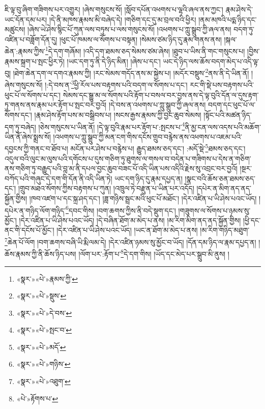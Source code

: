 ཇི་ལྟ་བུ་ཞིག་གཟིགས་པར་འགྱུར། །ཞེས་གསུངས་སོ། །སློབ་དཔོན་འཕགས་པ་ལྷའི་ཞལ་ནས་ཀྱང་། རྣམ་ཤེས་དེ་ཡང་དོན་དམ་པར། །དེ་ནི་མཁས་རྣམས་མི་བཞེད་དེ། །གཅིག་དང་དུ་མ་བྲལ་བའི་ཕྱིར། །ནམ་མཁའི་པདྨ་ཉིད་དང་མཚུངས། །ཞེས་ཡེ་ཤེས་སྙིང་པོ་ཀུན་ལས་བཏུས་པ་ལས་གསུངས་སོ། །འཕགས་པ་ཀླུ་སྒྲུབ་ཀྱི་ཞལ་ནས། བདག་ཏུ་འཛིན་པ་བཟློག་དོན་དུ། །ཕུང་པོ་ཁམས་ལ་སོགས་པ་བསྟན། །སེམས་ཙམ་ཉིད་དུ་རྣམ་གནས་ནས། །སྐལ་ཆེན་:རྣམས་ཀྱིས་\footnote{«སྣར་»«པེ་»རྣམས་ཀྱི་}དེ་དག་གཞོམ། །འདི་དག་ཐམས་ཅད་སེམས་ཙམ་ཞེས། །ཐུབ་པ་ཡིས་ནི་གང་གསུངས་པ། །བྱིས་རྣམས་སྐྲག་པ་སྤང་ཕྱིར་ཏེ། །ཡང་དག་ཏུ་ནི་དེ་ཉིད་མིན། །ཞེས་པ་དང་། ཡང་དེ་ཉིད་ལས་ཆོས་བདག་མེད་པ་འདི་ལྟ་བུ། །ཐེག་ཆེན་དག་ལ་དགའ་རྣམས་ཀྱི། །རང་སེམས་གདོད་ནས་མ་སྐྱེས་པ། །མདོར་བསྡུས་\footnote{«སྣར་»«པེ་»སྡུས་}ནས་ནི་དེ་ཡིན་ནོ། །ཞེས་གསུངས་སོ། །:དེ་བས་ན་\footnote{«སྣར་»«པེ་»དེ་བས་}ཕྱི་རོལ་པས་བརྟགས་པའི་བདག་ལ་སོགས་པ་དང་། རང་གི་སྡེ་པས་བརྟགས་པའི་ཕུང་པོ་ལ་སོགས་པ་དང་། སེམས་དང་སྒྱུ་མ་ལ་སོགས་པའི་རྟོག་པ་བསལ་བར་བྱས་ནས་དེ་ལྟ་བུའི་དོན་ལ་དུས་རྟག་ཏུ་གནས་ནས་རྣམ་པར་རྟོག་པ་སྤང་བར་བྱའོ། །དེ་བས་ན་འཕགས་པ་ཀླུ་སྒྲུབ་ཀྱི་ཞལ་ནས། བདག་དང་ཕུང་པོ་ལ་སོགས་དང་། །རྣམ་ཤེས་རྟོག་པས་མ་བསྒྲིབས་པ། །སངས་རྒྱས་རྣམས་ཀྱི་བྱང་ཆུབ་སེམས། །སྟོང་པའི་མཚན་ཉིད་དག་ཏུ་བཞེད། །ཅེས་གསུངས་པ་ཡིན་ནོ། །དེ་ལྟ་བུའི་རྣམ་པར་རྟོག་པ་:སྤངས་པ་\footnote{«སྣར་»«པེ་»སྤང་བ་}ནི་མྱ་ངན་ལས་འདས་པའི་མཆོག་ཡིན་ནོ་ཞེས་སྨྲས་སོ། །འཕགས་པ་ཀླུ་སྒྲུབ་ཀྱི་མན་ངག་གིས་དངོས་གྲུབ་བརྙེས་ནས་འཕགས་པ་འཇམ་པའི་དབྱངས་ཀྱི་གནང་བ་ཐོབ་པ། མངོན་པར་ཤེས་པ་བརྙེས་པ། རྒྱུད་ཐམས་ཅད་དང་། :མདོ་སྡེ་\footnote{«སྣར་»«པེ་»མདོ་}ཐམས་ཅད་དང་། འདུལ་བའི་ལུང་མ་ལུས་པའི་དགོངས་པ་དུས་གཅིག་ཏུ་ཐུགས་ལ་གསལ་བ་བདེན་པ་གཟིགས་པ་དེས་ན་གཅིག་ནས་གཅིག་ཏུ་བརྒྱུད་པའི་བླ་མ་ནི་དཔལ་བྱང་ཆུབ་བཟང་པོ་འདི་ཡིན་པས་འདིའི་རྗེས་སུ་འབྲང་བར་བྱའོ། །སྔར་བཀོད་པའི་གཞུང་དེ་དག་གི་དོན་ནི་འདི་ཡིན་ཏེ། ཡང་དག་ཉིད་དུ་རྣམ་དཔྱད་ན། །སྣང་བའི་ཆོས་ཅན་ཐམས་ཅད་དང་། །གྲུབ་མཐའ་སོགས་ཀྱིས་བརྟགས་པ་ཀུན། །འཁྲུལ་ཏེ་བརྫུན་པ་ཡིན་པར་འདོད། །དཔེར་ན་མིག་ནད་ནད་སྐྱོན་གྱིས། །ཁབ་འཛག་པ་དང་སྐྲ་ཤད་དང་། །ཟླ་གཉིས་སྦྲང་མའི་ཕུང་པོ་མཐོང་། །དེར་འཛིན་པ་ཡི་ཤེས་པའང་ཡོད། །དཔེར་ན་གཉིད་ལོག་གཉིད་\footnote{«སྣར་»«པེ་»གཉིས་}དབང་གིས། །བག་ཆགས་ཀྱིས་ནི་བདེ་སྡུག་དང་། །གཟུགས་ལ་སོགས་པ་ཉམས་སུ་མྱོང་། །དེར་འཛིན་པ་ཡི་ཤེས་པའང་ཡོད། །དེ་བཞིན་ཐོག་མ་མེད་པ་ནས། །མ་རིག་མིག་ནད་ནད་སྐྱོན་གྱིས། །ཕྱི་དང་ནང་གི་དངོས་པོ་མྱོང་། །དེར་འཛིན་པ་ཡི་ཤེས་པའང་ཡོད། །ཡང་ན་ཐོག་མ་མེད་པ་ནས། །མ་རིག་གཉིད་མཐུག་\footnote{«སྣར་»«པེ་»འཐུག་}ཆེན་པོ་ལོག །བག་ཆགས་བཞི་ཡི་རྨི་ལམ་དེ། །དེར་འཛིན་ཉམས་སུ་མྱོང་བ་ཡོད། །དོན་དམ་ཉིད་ལ་རྣམ་དཔྱད་ན། །ཆོས་རྣམས་ཀྱི་ནི་ཆོས་ཉིད་པས། །ལོག་པར་:རྟོག་པ་\footnote{«པེ་»རྟོགས་པ་}དེ་དག་གིས། །ཡོད་དང་མེད་པར་སྒྲུབ་མི་ནུས། །
